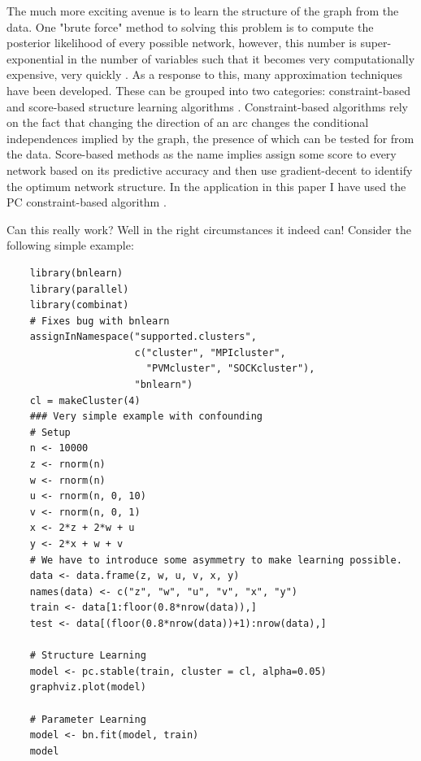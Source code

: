 \documentclass{article}
\begin{document}
The much more exciting avenue is to learn the structure of the graph from the data. One "brute force" method to solving this problem is to compute the posterior likelihood of every possible network, however, this number is super-exponential in the number of variables such that it becomes very computationally expensive, very quickly \cite{chickering1996learning}. As a response to this, many approximation techniques have been developed. These can be grouped into two categories: constraint-based and score-based structure learning algorithms \cite{spirtes1991algorithm} \cite{verma1991equivalence}. Constraint-based algorithms rely on the fact that changing the direction of an arc changes the conditional independences implied by the graph, the presence of which can be tested for from the data. Score-based methods as the name implies assign some score to every network based on its predictive accuracy and then use gradient-decent to identify the optimum network structure. In the application in this paper I have used the PC constraint-based algorithm \cite{spirtes2000causation} \cite{le2015parallelpc}.

Can this really work? Well in the right circumstances it indeed can! Consider the following simple example:

\begin{verbatim}
    library(bnlearn)
    library(parallel)
    library(combinat)
    # Fixes bug with bnlearn
    assignInNamespace("supported.clusters", 
                      c("cluster", "MPIcluster",  
                        "PVMcluster", "SOCKcluster"), 
                      "bnlearn")
    cl = makeCluster(4)
    ### Very simple example with confounding
    # Setup
    n <- 10000
    z <- rnorm(n)
    w <- rnorm(n)
    u <- rnorm(n, 0, 10)
    v <- rnorm(n, 0, 1)
    x <- 2*z + 2*w + u
    y <- 2*x + w + v
    # We have to introduce some asymmetry to make learning possible.
    data <- data.frame(z, w, u, v, x, y)
    names(data) <- c("z", "w", "u", "v", "x", "y")
    train <- data[1:floor(0.8*nrow(data)),]
    test <- data[(floor(0.8*nrow(data))+1):nrow(data),]
    
    # Structure Learning
    model <- pc.stable(train, cluster = cl, alpha=0.05)
    graphviz.plot(model)

    # Parameter Learning
    model <- bn.fit(model, train)
    model
\end{verbatim}
\end{document}
